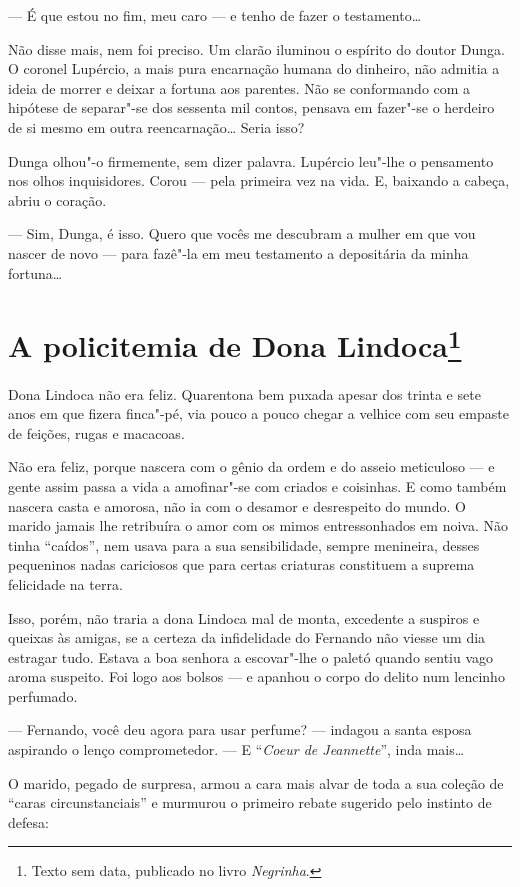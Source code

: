 --- É que estou no fim, meu caro --- e tenho de fazer o testamento\ldots{}

Não disse mais, nem foi preciso. Um clarão iluminou o espírito do doutor
Dunga. O coronel Lupércio, a mais pura encarnação humana do dinheiro,
não admitia a ideia de morrer e deixar a fortuna aos parentes. Não se
conformando com a hipótese de separar"-se dos sessenta mil contos,
pensava em fazer"-se o herdeiro de si mesmo em outra reencarnação\ldots{}
Seria isso?

Dunga olhou"-o firmemente, sem dizer palavra. Lupércio leu"-lhe o
pensamento nos olhos inquisidores. Corou --- pela primeira vez na vida.
E, baixando a cabeça, abriu o coração.

--- Sim, Dunga, é isso. Quero que vocês me descubram a mulher em que vou
nascer de novo --- para fazê"-la em meu testamento a depositária da minha
fortuna\ldots{}

\chapter{A policitemia de Dona Lindoca\footnote[*]{Texto sem data, publicado no livro \emph{Negrinha}.}}

Dona Lindoca não era feliz. Quarentona bem puxada apesar dos trinta e
sete anos em que fizera finca"-pé, via pouco a pouco chegar a velhice com
seu empaste de feições, rugas e macacoas.

Não era feliz, porque nascera com o gênio da ordem e do asseio
meticuloso --- e gente assim passa a vida a amofinar"-se com criados e
coisinhas. E como também nascera casta e amorosa, não ia com o desamor e
desrespeito do mundo. O marido jamais lhe retribuíra o amor com os mimos
entressonhados em noiva. Não tinha ``caídos'', nem usava para a sua
sensibilidade, sempre menineira, desses pequeninos nadas cariciosos que
para certas criaturas constituem a suprema felicidade na terra.

Isso, porém, não traria a dona Lindoca mal de monta, excedente a
suspiros e queixas às amigas, se a certeza da infidelidade do Fernando
não viesse um dia estragar tudo. Estava a boa senhora a escovar"-lhe o
paletó quando sentiu vago aroma suspeito. Foi logo aos bolsos --- e
apanhou o corpo do delito num lencinho perfumado.

--- Fernando, você deu agora para usar perfume? --- indagou a santa
esposa aspirando o lenço comprometedor. --- E ``\emph{Coeur de
Jeannette}'', inda mais\ldots{}

O marido, pegado de surpresa, armou a cara mais alvar de toda a sua
coleção de ``caras circunstanciais'' e murmurou o primeiro rebate
sugerido pelo instinto de defesa:

